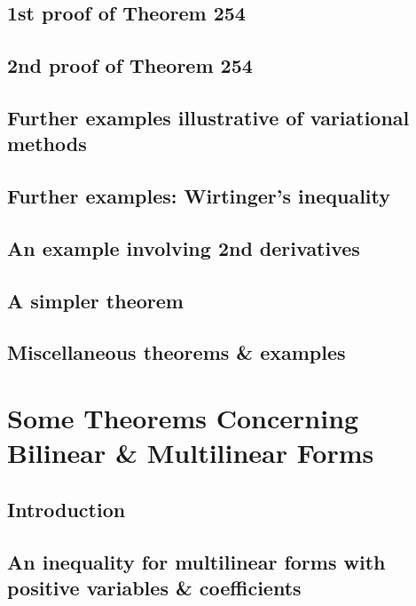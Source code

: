 \documentclass[oneside]{book}
\numberwithin{equation}{section}
\begin{document}
\subsection{1st proof of Theorem 254}

\subsection{2nd proof of Theorem 254}

\subsection{Further examples illustrative of variational methods}

\subsection{Further examples: Wirtinger's inequality}

\subsection{An example involving 2nd derivatives}

\subsection{A simpler theorem}

\subsection{Miscellaneous theorems \& examples}


\section{Some Theorems Concerning Bilinear \& Multilinear Forms}

\subsection{Introduction}

\subsection{An inequality for multilinear forms with positive variables \& coefficients}
\end{document}
